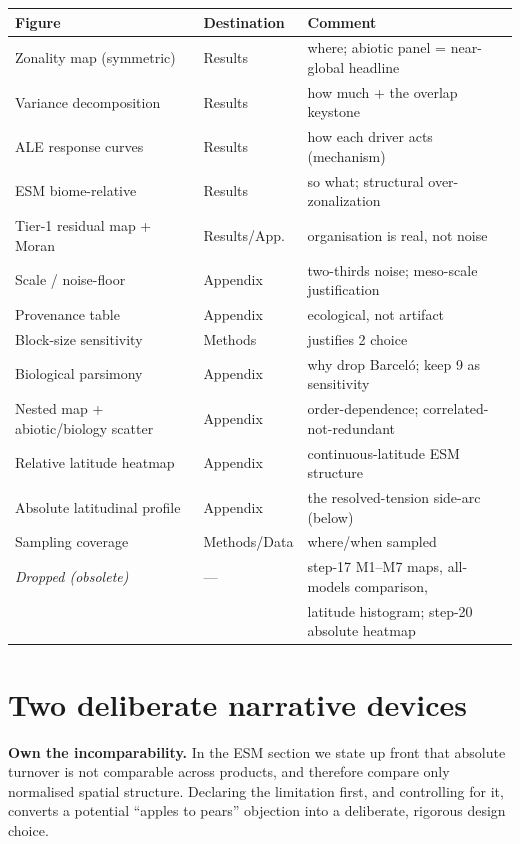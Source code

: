 \documentclass[11pt]{article}
\begin{document}
\begin{table}[h!]\centering\small
\begin{tabular}{lll}
\toprule
Figure & Destination & Comment \\
\midrule
Zonality map (symmetric) & Results & where; abiotic panel = near-global headline \\
Variance decomposition & Results & how much + the overlap keystone \\
ALE response curves & Results & how each driver acts (mechanism) \\
ESM biome-relative & Results & so what; structural over-zonalization \\
Tier-1 residual map + Moran & Results/App. & organisation is real, not noise \\
Scale / noise-floor & Appendix & two-thirds noise; meso-scale justification \\
Provenance table & Appendix & ecological, not artifact \\
Block-size sensitivity & Methods & justifies 2\textdegree{} choice \\
Biological parsimony & Appendix & why drop Barcel\'o; keep 9 as sensitivity \\
Nested map + abiotic/biology scatter & Appendix & order-dependence; correlated-not-redundant \\
Relative latitude heatmap & Appendix & continuous-latitude ESM structure \\
Absolute latitudinal profile & Appendix & the resolved-tension side-arc (below) \\
Sampling coverage & Methods/Data & where/when sampled \\
\midrule
\textit{Dropped (obsolete)} & --- & step-17 M1--M7 maps, all-models comparison, \\
 & & latitude histogram; step-20 absolute heatmap \\
\bottomrule
\end{tabular}
\end{table}

\section{Two deliberate narrative devices}

\textbf{Own the incomparability.} In the ESM section we state up front that
absolute turnover is not comparable across products, and therefore compare only
normalised spatial structure. Declaring the limitation first, and controlling for
it, converts a potential ``apples to pears'' objection into a deliberate,
rigorous design choice.
\end{document}
